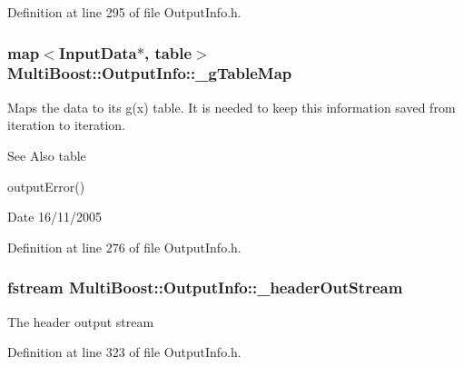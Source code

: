 Definition at line 295 of file Output\-Info.\-h.

\hypertarget{classMultiBoost_1_1OutputInfo_a0d95c1f68bad97c49e0333bdde066940}{
\subsubsection[{\-\_\-g\-Table\-Map}]{\setlength{\rightskip}{0pt plus 5cm}map$<${\bf Input\-Data}$\ast$, table$>$ Multi\-Boost\-::\-Output\-Info\-::\-\_\-g\-Table\-Map\hspace{0.3cm}{\ttfamily [protected]}}}\label{classMultiBoost_1_1OutputInfo_a0d95c1f68bad97c49e0333bdde066940}
Maps the data to its g(x) table. It is needed to keep this information saved from iteration to iteration. \begin{DoxySeeAlso}{See Also}
table 

output\-Error() 
\end{DoxySeeAlso}
\begin{DoxyDate}{Date}
16/11/2005 
\end{DoxyDate}


Definition at line 276 of file Output\-Info.\-h.

\hypertarget{classMultiBoost_1_1OutputInfo_a18631871093bb6fb65a4ebb0e50909a4}{
\subsubsection[{\-\_\-header\-Out\-Stream}]{\setlength{\rightskip}{0pt plus 5cm}fstream Multi\-Boost\-::\-Output\-Info\-::\-\_\-header\-Out\-Stream\hspace{0.3cm}{\ttfamily [protected]}}}\label{classMultiBoost_1_1OutputInfo_a18631871093bb6fb65a4ebb0e50909a4}
The header output stream 

Definition at line 323 of file Output\-Info.\-h.

